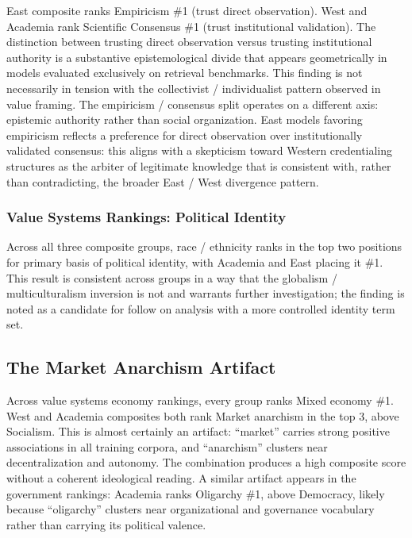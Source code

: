 \documentclass[11pt, letterpaper]{article}
\begin{document}
East composite ranks Empiricism \#1 (trust direct observation). West and Academia rank Scientific Consensus \#1 (trust institutional validation). The distinction between trusting direct observation versus trusting institutional authority is a substantive epistemological divide that appears geometrically in models evaluated exclusively on retrieval benchmarks. This finding is not necessarily in tension with the collectivist / individualist pattern observed in value framing. The empiricism / consensus split operates on a different axis: epistemic authority rather than social organization. East models favoring empiricism reflects a preference for direct observation over institutionally validated consensus: this aligns with a skepticism toward Western credentialing structures as the arbiter of legitimate knowledge that is consistent with, rather than contradicting, the broader East / West divergence pattern.

\subsubsection{Value Systems Rankings: Political Identity}

Across all three composite groups, race / ethnicity ranks in the top two positions for primary basis of political identity, with Academia and East placing it \#1. This result is consistent across groups in a way that the globalism / multiculturalism inversion is not and warrants further investigation; the finding is noted as a candidate for follow on analysis with a more controlled identity term set.

\newpage

\subsection{The Market Anarchism Artifact}
\label{sec:market-anarchism}

Across value systems economy rankings, every group ranks Mixed economy \#1. West and Academia composites both rank Market anarchism in the top 3, above Socialism. This is almost certainly an artifact: ``market'' carries strong positive associations in all training corpora, and ``anarchism'' clusters near decentralization and autonomy. The combination produces a high composite score without a coherent ideological reading. A similar artifact appears in the government rankings: Academia ranks Oligarchy \#1, above Democracy, likely because ``oligarchy'' clusters near organizational and governance vocabulary rather than carrying its political valence.
\end{document}
